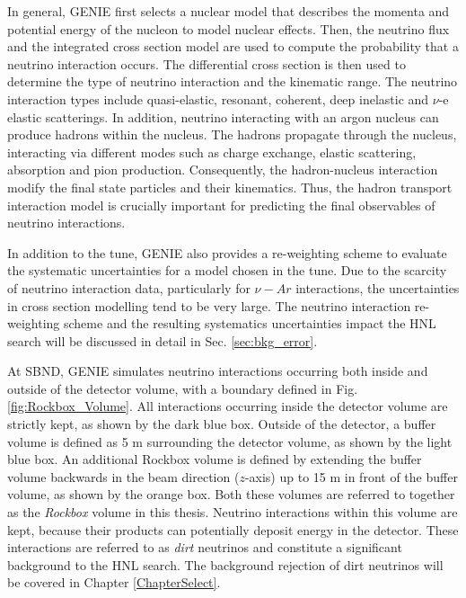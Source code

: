 In general, GENIE first selects a nuclear model that describes the momenta and potential energy of the nucleon to model nuclear effects.                                                                                           
Then, the neutrino flux and the integrated cross section model are used to compute the probability that a neutrino interaction occurs.
The differential cross section is then used to determine the type of neutrino interaction and the kinematic range.
The neutrino interaction types include quasi-elastic, resonant, coherent, deep inelastic and $\nu$-e elastic scatterings.
In addition, neutrino interacting with an argon nucleus can produce hadrons within the nucleus.
The hadrons propagate through the nucleus, interacting via different modes such as charge exchange, elastic scattering, absorption and pion production.
Consequently, the hadron-nucleus interaction modify the final state particles and their kinematics.
Thus, the hadron transport interaction model is crucially important for predicting the final observables of neutrino interactions.

In addition to the tune, GENIE also provides a re-weighting scheme to evaluate the systematic uncertainties for a model chosen in the tune.
Due to the scarcity of neutrino interaction data, particularly for $\nu-Ar$ interactions, the uncertainties in cross section modelling tend to be very large. 
The neutrino interaction re-weighting scheme and the resulting systematics uncertainties impact the HNL search will be discussed in detail in Sec. \ref{sec:bkg_error}.

At SBND, GENIE simulates neutrino interactions occurring both inside and outside of the detector volume, with a boundary defined in Fig. \ref{fig:Rockbox_Volume}.  
All interactions occurring inside the detector volume are strictly kept, as shown by the dark blue box.
Outside of the detector, a buffer volume is defined as 5 m surrounding the detector volume, as shown by the light blue box.                       
An additional Rockbox volume is defined by extending the buffer volume backwards in the beam direction ($z$-axis) up to 15 m in front of the buffer volume, as shown by the orange box.
Both these volumes are referred to together as the \textit{Rockbox} volume in this thesis.
Neutrino interactions within this volume are kept, because their products can potentially deposit energy in the detector.
These interactions are referred to as \textit{dirt} neutrinos and constitute a significant background to the HNL search.
The background rejection of dirt neutrinos will be covered in Chapter \ref{ChapterSelect}.

